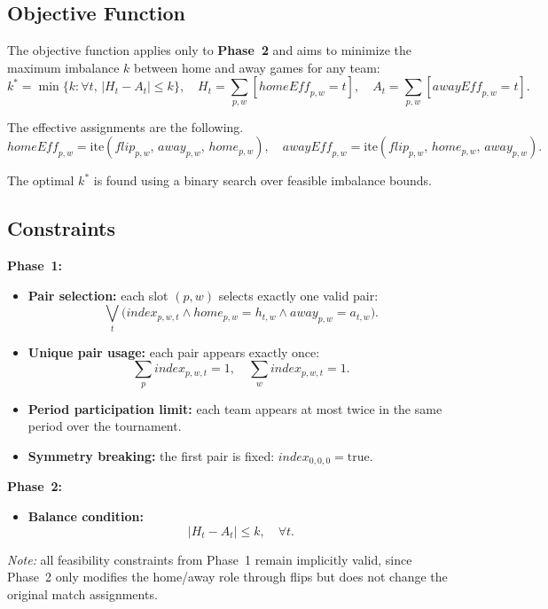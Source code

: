 \subsection{Objective Function}

The objective function applies only to \textbf{Phase~2} and aims to minimize the maximum imbalance $k$ between home and away games for any team:
\[
k^* = \min \{ k : \forall t,\, |H_t - A_t| \leq k \},
\quad H_t = \sum_{p,w} [\mathit{homeEff}_{p,w} = t], \quad
A_t = \sum_{p,w} [\mathit{awayEff}_{p,w} = t].
\]

The effective assignments are the following.
\[
\mathit{homeEff}_{p,w} = \text{ite}(\mathit{flip}_{p,w},\, \mathit{away}_{p,w},\, \mathit{home}_{p,w}), \quad
\mathit{awayEff}_{p,w} = \text{ite}(\mathit{flip}_{p,w},\, \mathit{home}_{p,w},\, \mathit{away}_{p,w}).
\]

The optimal $k^*$ is found using a binary search over feasible imbalance bounds.

\subsection{Constraints}

\textbf{Phase~1:}
\begin{itemize}
    \item \textbf{Pair selection:} each slot $(p,w)$ selects exactly one valid pair:
    \[
    \bigvee_{t} \Big(
        \mathit{index}_{p,w,t} \wedge
        \mathit{home}_{p,w} = h_{t,w} \wedge
        \mathit{away}_{p,w} = a_{t,w}
    \Big).
    \]
    \item \textbf{Unique pair usage:} each pair appears exactly once:
    \[
    \sum_{p} \mathit{index}_{p,w,t} = 1, \quad \sum_{w} \mathit{index}_{p,w,t} = 1.
    \]
    \item \textbf{Period participation limit:} each team appears at most twice in the same period over the tournament.
    \item \textbf{Symmetry breaking:} the first pair is fixed: $\mathit{index}_{0,0,0} = \text{true}$.
\end{itemize}

\textbf{Phase~2:}
\begin{itemize}
    \item \textbf{Balance condition:}
    \[
    |H_t - A_t| \leq k, \quad \forall t.
    \]
\end{itemize}
\textit{Note:} all feasibility constraints from Phase~1 remain implicitly valid, since Phase~2 only modifies the home/away role through flips but does not change the original match assignments.


